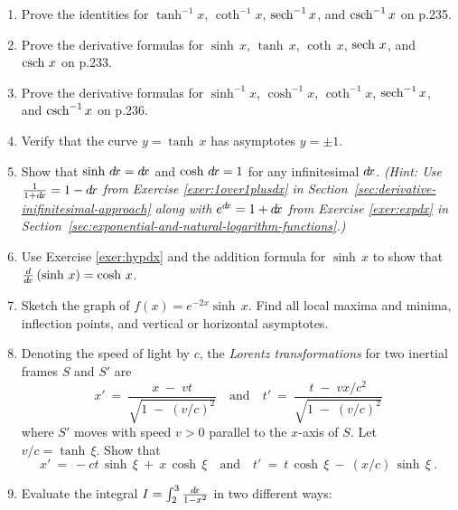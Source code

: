 {\begin{enumerate}[\bfseries 1.]
 \item Prove the identities for $\tanh^{-1} x$, $\coth^{-1} x$, $\operatorname{sech}^{-1} x$,
  and $\operatorname{csch}^{-1} x$ on p.235.
 \item Prove the derivative formulas for $\sinh\,x$, $\tanh\,x$, $\coth\,x$,
  $\operatorname{sech}\,x$, and $\operatorname{csch}\,x$ on p.233.
 \item Prove the derivative formulas for $\sinh^{-1} x$, $\cosh^{-1} x$,
  $\coth^{-1} x$, $\operatorname{sech}^{-1} x$, and $\operatorname{csch}^{-1} x$ on p.236.
 \item Verify that the curve $y=\tanh\,x$ has asymptotes $y=\pm 1$.
 \item\label{exer:hypdx} Show that $\sinh\,d\!x = d\!x$ and $\cosh\,d\!x=1$ for any
  infinitesimal $d\!x$. \emph{(Hint: Use $\tfrac{1}{1+d\!x} = 1 - d\!x$ from
  Exercise \ref{exer:1over1plusdx} in Section~\ref{sec:derivative-inifinitesimal-approach} along with $e^{d\!x}=1+d\!x$
  from Exercise \ref{exer:expdx} in Section~\ref{sec:exponential-and-natural-logarithm-functions}.)}
 \item Use Exercise \ref{exer:hypdx} and the addition formula for $\sinh\,x$
  to show that $\frac{d}{d\!x}\,(\sinh\,x) = \cosh\,x$.
 \item Sketch the graph of $f(x)=e^{-2x} \sinh\,x$. Find all local maxima and
  minima, inflection points, and vertical or horizontal asymptotes.
 \item Denoting the speed of light by $c$, the
  \emph{Lorentz transformations} for two inertial
  frames $S$ and $S'$ are
\[
x' ~=~ \frac{x \;-\; vt}{\sqrt{1 \;-\; (v/c)^2}} \quad\text{and}\quad
t' ~=~ \frac{t \;-\; vx/c^2}{\sqrt{1 \;-\; (v/c)^2}}
\]
where $S'$ moves with speed $v>0$ parallel to the $x$-axis of $S$. Let
$v/c = \tanh\,\xi$. Show that
\[
x' ~=~ -ct\,\sinh\,\xi ~+~ x\,\cosh\,\xi \quad\text{and}\quad
t' ~=~ t\,\cosh\,\xi ~-~ (x/c)\,\sinh\,\xi ~.
\]
 \item Evaluate the integral $I=\int_2^3 \frac{d\!x}{1-x^2}$ in two different
 ways:
 \begin{enumerate}[\bfseries (a)]

\end{enumerate}
\end{enumerate}}
